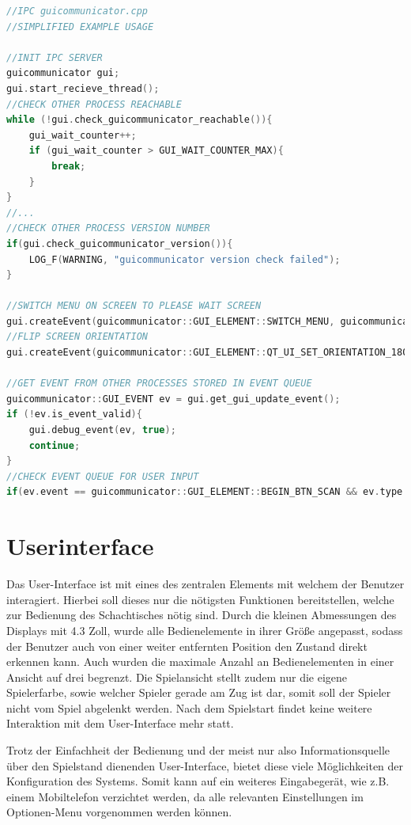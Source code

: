\begin{lstlisting}[language={C++}]
//IPC guicommunicator.cpp
//SIMPLIFIED EXAMPLE USAGE

//INIT IPC SERVER
guicommunicator gui;
gui.start_recieve_thread();
//CHECK OTHER PROCESS REACHABLE
while (!gui.check_guicommunicator_reachable()){
    gui_wait_counter++;
    if (gui_wait_counter > GUI_WAIT_COUNTER_MAX){
        break;
    }
}
//...
//CHECK OTHER PROCESS VERSION NUMBER
if(gui.check_guicommunicator_version()){
    LOG_F(WARNING, "guicommunicator version check failed");
}

//SWITCH MENU ON SCREEN TO PLEASE WAIT SCREEN
gui.createEvent(guicommunicator::GUI_ELEMENT::SWITCH_MENU, guicommunicator::GUI_VALUE_TYPE::PROCESSING_SCREEN);
//FLIP SCREEN ORIENTATION
gui.createEvent(guicommunicator::GUI_ELEMENT::QT_UI_SET_ORIENTATION_180, guicommunicator::GUI_VALUE_TYPE::ENABLED);

//GET EVENT FROM OTHER PROCESSES STORED IN EVENT QUEUE
guicommunicator::GUI_EVENT ev = gui.get_gui_update_event();
if (!ev.is_event_valid){
    gui.debug_event(ev, true);
    continue;
}
//CHECK EVENT QUEUE FOR USER INPUT
if(ev.event == guicommunicator::GUI_ELEMENT::BEGIN_BTN_SCAN && ev.type == guicommunicator::GUI_VALUE_TYPE::CLICKED) {}
\end{lstlisting}

\hypertarget{userinterface}{%
\section{Userinterface}\label{userinterface}}

Das User-Interface ist mit eines des zentralen Elements mit welchem der
Benutzer interagiert. Hierbei soll dieses nur die nötigsten Funktionen
bereitstellen, welche zur Bedienung des Schachtisches nötig sind. Durch
die kleinen Abmessungen des Displays mit 4.3 Zoll, wurde alle
Bedienelemente in ihrer Größe angepasst, sodass der Benutzer auch von
einer weiter entfernten Position den Zustand direkt erkennen kann. Auch
wurden die maximale Anzahl an Bedienelementen in einer Ansicht auf drei
begrenzt. Die Spielansicht stellt zudem nur die eigene Spielerfarbe,
sowie welcher Spieler gerade am Zug ist dar, somit soll der Spieler
nicht vom Spiel abgelenkt werden. Nach dem Spielstart findet keine
weitere Interaktion mit dem User-Interface mehr statt.

Trotz der Einfachheit der Bedienung und der meist nur also
Informationsquelle über den Spielstand dienenden User-Interface, bietet
diese viele Möglichkeiten der Konfiguration des Systems. Somit kann auf
ein weiteres Eingabegerät, wie z.B. einem Mobiltelefon verzichtet
werden, da alle relevanten Einstellungen im Optionen-Menu vorgenommen
werden können.

